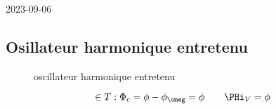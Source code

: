 


2023-09-06

\setcounter{section}{2}
\setcounter{subsection}{3}

\subsection{Osillateur harmonique entretenu}



\begin{figure}[ht]
    \centering
    \caption{oscillateur harmonique entretenu}
    \label{fig:oscillateur-harmonique-entretenu}
\end{figure}


\[ \in T: \Phi_c = \phi - \phi_{\omeg} = \phi \qquad \PHi_V = \phi \]



